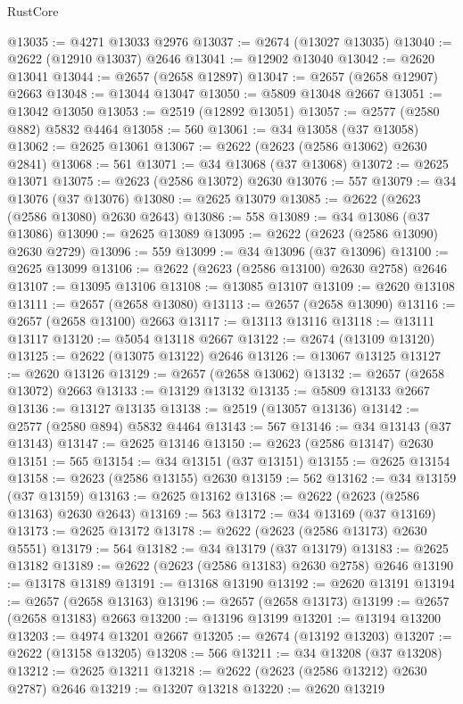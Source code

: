 \begin{lexlean}{RustCore}
\begin{coremodule}
@13035 := @4271 @13033 @2976
@13037 := @2674 (@13027 @13035)
@13040 := @2622 (@12910 @13037) @2646
@13041 := @12902 @13040
@13042 := @2620 @13041
@13044 := @2657 (@2658 @12897)
@13047 := @2657 (@2658 @12907) @2663
@13048 := @13044 @13047
@13050 := @5809 @13048 @2667
@13051 := @13042 @13050
@13053 := @2519 (@12892 @13051)
@13057 := @2577 (@2580 @882) @5832 @4464
@13058 := 560
@13061 := @34 @13058 (@37 @13058)
@13062 := @2625 @13061
@13067 := @2622 (@2623 (@2586 @13062) @2630 @2841)
@13068 := 561
@13071 := @34 @13068 (@37 @13068)
@13072 := @2625 @13071
@13075 := @2623 (@2586 @13072) @2630
@13076 := 557
@13079 := @34 @13076 (@37 @13076)
@13080 := @2625 @13079
@13085 := @2622 (@2623 (@2586 @13080) @2630 @2643)
@13086 := 558
@13089 := @34 @13086 (@37 @13086)
@13090 := @2625 @13089
@13095 := @2622 (@2623 (@2586 @13090) @2630 @2729)
@13096 := 559
@13099 := @34 @13096 (@37 @13096)
@13100 := @2625 @13099
@13106 := @2622 (@2623 (@2586 @13100) @2630 @2758) @2646
@13107 := @13095 @13106
@13108 := @13085 @13107
@13109 := @2620 @13108
@13111 := @2657 (@2658 @13080)
@13113 := @2657 (@2658 @13090)
@13116 := @2657 (@2658 @13100) @2663
@13117 := @13113 @13116
@13118 := @13111 @13117
@13120 := @5054 @13118 @2667
@13122 := @2674 (@13109 @13120)
@13125 := @2622 (@13075 @13122) @2646
@13126 := @13067 @13125
@13127 := @2620 @13126
@13129 := @2657 (@2658 @13062)
@13132 := @2657 (@2658 @13072) @2663
@13133 := @13129 @13132
@13135 := @5809 @13133 @2667
@13136 := @13127 @13135
@13138 := @2519 (@13057 @13136)
@13142 := @2577 (@2580 @894) @5832 @4464
@13143 := 567
@13146 := @34 @13143 (@37 @13143)
@13147 := @2625 @13146
@13150 := @2623 (@2586 @13147) @2630
@13151 := 565
@13154 := @34 @13151 (@37 @13151)
@13155 := @2625 @13154
@13158 := @2623 (@2586 @13155) @2630
@13159 := 562
@13162 := @34 @13159 (@37 @13159)
@13163 := @2625 @13162
@13168 := @2622 (@2623 (@2586 @13163) @2630 @2643)
@13169 := 563
@13172 := @34 @13169 (@37 @13169)
@13173 := @2625 @13172
@13178 := @2622 (@2623 (@2586 @13173) @2630 @5551)
@13179 := 564
@13182 := @34 @13179 (@37 @13179)
@13183 := @2625 @13182
@13189 := @2622 (@2623 (@2586 @13183) @2630 @2758) @2646
@13190 := @13178 @13189
@13191 := @13168 @13190
@13192 := @2620 @13191
@13194 := @2657 (@2658 @13163)
@13196 := @2657 (@2658 @13173)
@13199 := @2657 (@2658 @13183) @2663
@13200 := @13196 @13199
@13201 := @13194 @13200
@13203 := @4974 @13201 @2667
@13205 := @2674 (@13192 @13203)
@13207 := @2622 (@13158 @13205)
@13208 := 566
@13211 := @34 @13208 (@37 @13208)
@13212 := @2625 @13211
@13218 := @2622 (@2623 (@2586 @13212) @2630 @2787) @2646
@13219 := @13207 @13218
@13220 := @2620 @13219

\end{coremodule}
\end{lexlean}
